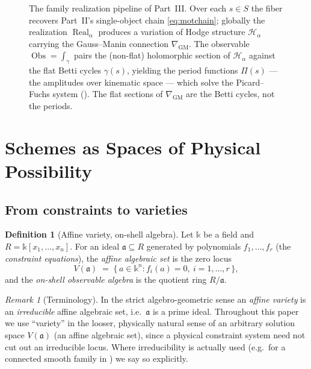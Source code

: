 \documentclass[12pt]{article}
\theoremstyle{definition}
\newtheorem{definition}[theorem]{Definition}
\theoremstyle{remark}
\newtheorem{remark}[theorem]{Remark}
\newcommand{\Mot}{\operatorname{Mot}}
\newcommand{\Real}{\operatorname{Real}}
\newcommand{\Obs}{\operatorname{Obs}}
\newcommand{\Ideal}{\mathfrak{a}}
\newcommand{\coeff}{\mathbb{k}}
\newcommand{\GM}{\nabla_{\mathrm{GM}}}
\begin{document}
\begin{figure}[!htbp]
\centering
{}
\caption{The family realization pipeline of Part~III. Over each $s\in S$ the fiber recovers Part~II's
single-object chain \eqref{eq:motchain}; globally the realization $\Real_\alpha$ produces a variation of
Hodge structure $\mathcal H_\alpha$ carrying the Gauss--Manin connection $\GM$. The observable
$\Obs=\int_\gamma$ pairs the (non-flat) holomorphic section of $\mathcal H_\alpha$ against the flat Betti
cycles $\gamma(s)$, yielding the period functions $\Pi(s)$ --- the amplitudes over kinematic space ---
which solve the Picard--Fuchs system (). The flat sections of $\GM$ are the Betti cycles,
not the periods.}
\label{fig:master}
\end{figure}

\section{Schemes as Spaces of Physical Possibility}
\label{sec:schemes}

\subsection{From constraints to varieties}

\begin{definition}[Affine variety, on-shell algebra]
\label{def:variety}
Let $\coeff$ be a field and $R=\coeff[x_1,\dots,x_n]$. For an ideal $\Ideal\subseteq R$ generated by
polynomials $f_1,\dots,f_r$ (the \emph{constraint equations}), the \emph{affine algebraic set} is the
zero locus
\[
  V(\Ideal) \;=\; \{\, a\in \coeff^n : f_i(a)=0,\ i=1,\dots,r \,\},
\]
and the \emph{on-shell observable algebra} is the quotient ring $R/\Ideal$.
\end{definition}

\begin{remark}[Terminology]
In the strict algebro-geometric sense an \emph{affine variety} is an \emph{irreducible} affine algebraic
set, i.e.\ $\Ideal$ is a prime ideal. Throughout this paper we use ``variety'' in the looser, physically
natural sense of an arbitrary solution space $V(\Ideal)$ (an affine algebraic set), since a physical
constraint system need not cut out an irreducible locus. Where irreducibility is actually used
(e.g.\ for a connected smooth family in ) we say so explicitly.
\end{remark}
\end{document}
